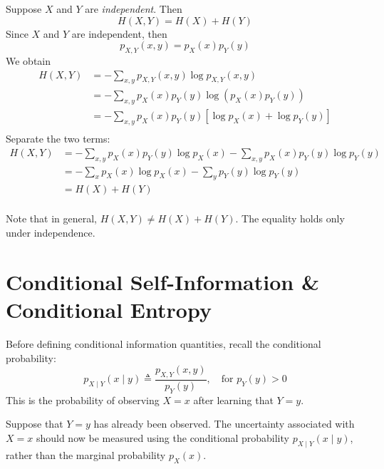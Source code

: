 \documentclass[11pt]{report}
\theoremstyle{lecturedefinition}
\theoremstyle{lectureremark}
\begin{document}
\begin{corollary}
Suppose $X$ and $Y$ are \textit{independent}. Then
\begin{equation*}
    H(X,Y)=H(X)+H(Y)
\end{equation*}
\tcblower
Since $X$ and $Y$ are independent, then
\begin{equation*}
    p_{X,Y}(x,y)=p_X(x)p_Y(y)
\end{equation*}
We obtain
\begin{equation*}
    \begin{aligned}
        H(X,Y)&=-\sum_{x,y}p_{X,Y}(x,y)\log p_{X,Y}(x,y)\\
        &=-\sum_{x,y}p_{X}(x)p_Y(y)\log \left(p_{X}(x)p_Y(y)\right)\\
        &=-\sum_{x,y}p_X(x)p_Y(y)\left[\log p_X(x)+\log p_Y(y) \right]\\
    \end{aligned}
\end{equation*}
Separate the two terms:
\begin{equation*}
    \begin{aligned}
        H(X,Y)&=-\sum_{x,y}p_X(x)p_{Y}(y)\log p_{X}(x)-\sum_{x,y}p_X(x)p_Y(y)\log p_Y(y)\\
        &=-\sum_{x}p_X(x)\log p_{X}(x)-\sum_{y}p_Y(y)\log p_{Y}(y)\\
        &=H(X)+H(Y)\\
    \end{aligned}
\end{equation*}
\end{corollary}
Note that in general, $H(X,Y)\ne H(X)+H(Y)$. The equality holds only under independence.

\section{Conditional Self-Information \& Conditional Entropy}
Before defining conditional information quantities, recall the conditional probability:
\begin{equation*}
    p_{X\mid Y}(x\mid y)\triangleq \frac{p_{X,Y}(x,y)}{p_Y(y)},\quad \text{for }p_Y(y)>0 
\end{equation*}
This is the probability of observing $X=x$ after learning that $Y=y$.

Suppose that $Y=y$ has already been observed. The uncertainty associated with $X=x$ should now be measured using the conditional probability $p_{X\mid Y}(x\mid y)$, rather than the marginal probability $p_X(x)$.
\end{document}
